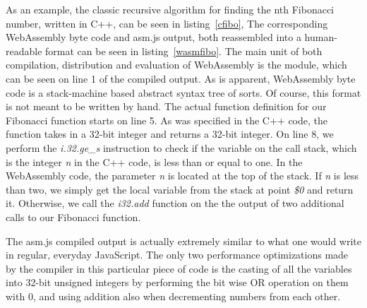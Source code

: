 \documentclass[conference]{IEEEtran}
\begin{document}
As an example, the classic recursive algorithm for finding the nth Fibonacci
number, written in C++, can be seen in listing~\ref{cfibo}, The corresponding
WebAssembly byte code and asm.js output, both reassembled into a human-readable
format can be seen in listing~\ref{wasmfibo}. The main unit of both
compilation, distribution and evaluation of WebAssembly is the module, which
can be seen on line 1 of the compiled output. As is apparent, WebAssembly
byte code is a stack-machine based abstract syntax tree of sorts. Of course,
this format is not meant to be written by hand. The actual function definition
for our Fibonacci function starts on line 5. As was specified in the C++ code,
the function takes in a 32-bit integer and returns a 32-bit integer. On line 8,
we perform the \emph{i.32.ge\_s} instruction to check if the variable on the
call stack, which is the integer \emph{n} in the C++ code, is less than or
equal to one. In the WebAssembly code, the parameter \emph{n} is located at the
top of the stack. If \emph{n} is less than two, we simply get the local
variable from the stack at point \emph{\$0} and return it. Otherwise, we call
the \emph{i32.add} function on the the output of two additional calls to our
Fibonacci function.

The asm.js compiled output is actually extremely similar to what one would
write in regular, everyday JavaScript. The only two performance optimizations
made by the compiler in this particular piece of code is the casting of all the
variables into 32-bit unsigned integers by performing the bit wise OR operation
on them with 0, and using addition also when decrementing numbers from each
other.
\end{document}

